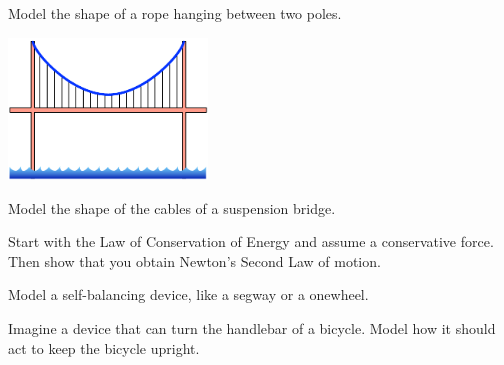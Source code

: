 \begin{exercises}
\begin{problist}
	\prob Model the shape of a rope hanging between two poles.

	\begin{center}
		\includegraphics*[width=150pt]{images/module20-suspensionbridge.pdf}
	\end{center}

	\prob Model the shape of the cables of a suspension bridge.
	
	\prob Start with the Law of Conservation of Energy and assume a conservative force. Then show that you obtain Newton's Second Law of motion.
	
	\prob Model a self-balancing device, like a segway or a onewheel.
	
	\prob Imagine a device that can turn the handlebar of a bicycle. Model how it should act to keep the bicycle upright.
	
	
	\end{problist}
\end{exercises}
